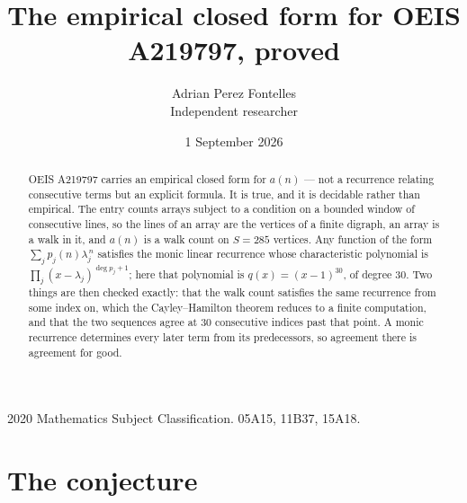 \documentclass[11pt,a4paper]{article}
\title{The empirical closed form for OEIS A219797, proved}
\author{Adrian Perez Fontelles\\ \small Independent researcher}
\date{1 September 2026}
\theoremstyle{plain}
\theoremstyle{definition}
\begin{document}
\maketitle

\begin{abstract}
OEIS A219797 carries an empirical closed form for $a(n)$ --- not a recurrence relating
consecutive terms but an explicit formula. It is true, and it is decidable rather than
empirical. The entry counts arrays subject to a condition on a bounded window of consecutive lines, so the lines of an array are the
vertices of a finite digraph, an array is a walk in it, and $a(n)$ is a walk count on
$S=285$ vertices. Any function of the form $\sum_j p_j(n)\lambda_j^{\,n}$ satisfies the
monic linear recurrence whose characteristic polynomial is
$\prod_j(x-\lambda_j)^{\deg p_j+1}$; here that polynomial is $q(x)=(x-1)^{30}$, of degree
$30$. Two things are then checked exactly: that the walk count satisfies the same
recurrence from some index on, which the Cayley--Hamilton theorem reduces to a finite
computation, and that the two sequences agree at $30$ consecutive indices past that
point. A monic recurrence determines every later term from its predecessors, so agreement
there is agreement for good.
\end{abstract}

\noindent\small 2020 Mathematics Subject Classification. 05A15, 11B37, 15A18.\normalsize

\section{The conjecture}
\end{document}
